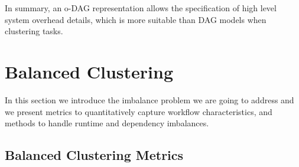 \documentclass[final]{IEEEtran}
\begin{document}

In summary, an o-DAG representation allows the specification of high level system overhead details, which is more suitable than DAG models when clustering tasks.

\section{Balanced Clustering}
\label{sec:heuristics}

In this section we introduce the imbalance problem we are going to address and we present metrics to quantitatively capture workflow characteristics, and methods to handle runtime and dependency imbalances.


\subsection{Balanced Clustering Metrics}


\end{document}
